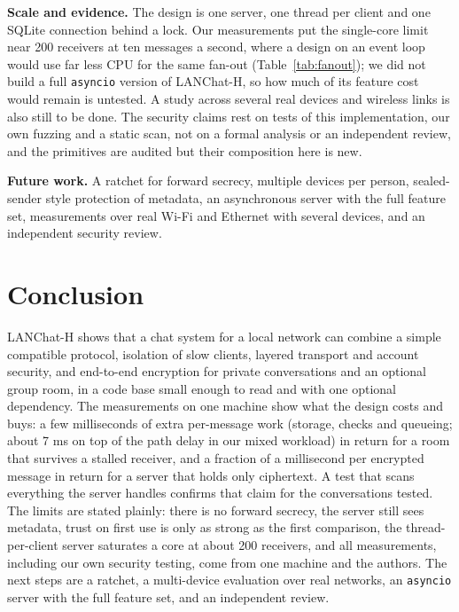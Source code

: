 \documentclass[conference]{IEEEtran}
\newcommand{\code}[1]{\texttt{#1}}
\begin{document}
\textbf{Scale and evidence.} The design is one server, one thread per client and one SQLite connection behind a lock. Our measurements put the single-core limit near 200 receivers at ten messages a second, where a design on an event loop \cite{pyasyncio} would use far less CPU for the same fan-out (Table~\ref{tab:fanout}); we did not build a full \code{asyncio} version of LANChat-H, so how much of its feature cost would remain is untested. A study across several real devices and wireless links is also still to be done. The security claims rest on tests of this implementation, our own fuzzing and a static scan, not on a formal analysis or an independent review, and the primitives are audited but their composition here is new.

\textbf{Future work.} A ratchet for forward secrecy, multiple devices per person, sealed-sender style protection of metadata, an asynchronous server with the full feature set, measurements over real Wi-Fi and Ethernet with several devices, and an independent security review.

\section{Conclusion}\label{sec:conclusion}
LANChat-H shows that a chat system for a local network can combine a simple compatible protocol, isolation of slow clients, layered transport and account security, and end-to-end encryption for private conversations and an optional group room, in a code base small enough to read and with one optional dependency. The measurements on one machine show what the design costs and buys: a few milliseconds of extra per-message work (storage, checks and queueing; about 7 ms on top of the path delay in our mixed workload) in return for a room that survives a stalled receiver, and a fraction of a millisecond per encrypted message in return for a server that holds only ciphertext. A test that scans everything the server handles confirms that claim for the conversations tested. The limits are stated plainly: there is no forward secrecy, the server still sees metadata, trust on first use is only as strong as the first comparison, the thread-per-client server saturates a core at about 200 receivers, and all measurements, including our own security testing, come from one machine and the authors. The next steps are a ratchet, a multi-device evaluation over real networks, an \code{asyncio} server with the full feature set, and an independent review.
\end{document}
